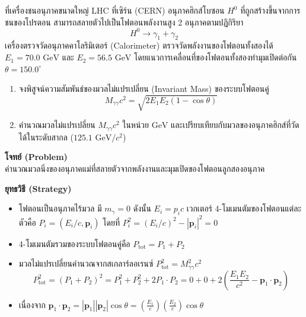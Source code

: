 \begin{psctexample}
ที่เครื่องชนอนุภาคขนาดใหญ่ LHC ที่เซิร์น (CERN) อนุภาคฮิกส์โบซอน $H^0$ ที่ถูกสร้างขึ้นจากการชนของโปรตอน สามารถสลายตัวไปเป็นโฟตอนพลังงานสูง 2 อนุภาคตามปฏิกิริยา
\begin{equation}
H^0 \to \gamma_1 + \gamma_2
\end{equation}
เครื่องตรวจวัดอนุภาคคาโลริมิเตอร์ (Calorimeter) ตรวจวัดพลังงานของโฟตอนทั้งสองได้ $E_1 = 70.0\text{ GeV}$ และ $E_2 = 56.5\text{ GeV}$ โดยแนวการเคลื่อนที่ของโฟตอนทั้งสองทำมุมเปิดต่อกัน $\theta = 150.0^\circ$
\begin{enumerate}
    \item จงพิสูจน์ความสัมพันธ์ของมวลไม่แปรเปลี่ยน (Invariant Mass) ของระบบโฟตอนคู่
    \begin{equation}
    M_{\gamma\gamma} c^2 = \sqrt{2 E_1 E_2 (1 - \cos\theta)}
    \end{equation}
    \item คำนวณมวลไม่แปรเปลี่ยน $M_{\gamma\gamma} c^2$ ในหน่วย $\text{GeV}$ และเปรียบเทียบกับมวลของอนุภาคฮิกส์ที่วัดได้ในระดับสากล ($125.1\text{ GeV}/c^2$)
\end{enumerate}

\textbf{โจทย์ (Problem)} \\
คำนวณ\mbox{มวลนิ่ง}ของอนุภาคแม่ที่สลายตัวจากพลังงานและมุมเปิดของโฟตอนลูกสองอนุภาค

\textbf{ยุทธวิธี (Strategy)} \\
\begin{itemize}
    \item โฟตอนเป็นอนุภาคไร้มวล มี $m_\gamma = 0$ ดังนั้น $E_i = p_i c$ เวกเตอร์ 4-โมเมนตัมของโฟตอนแต่ละตัวคือ $P_i = (E_i/c, \mathbf{p}_i)$ โดยที่ $P_i^2 = (E_i/c)^2 - |\mathbf{p}_i|^2 = 0$
    \item 4-โมเมนตัมรวมของระบบโฟตอนคู่คือ $P_{\text{tot}} = P_1 + P_2$
    \item มวลไม่แปรเปลี่ยนคำนวณจากสเกลาร์ลอเรนซ์ $P_{\text{tot}}^2 = M_{\gamma\gamma}^2 c^2$
    \begin{equation}
    P_{\text{tot}}^2 = (P_1 + P_2)^2 = P_1^2 + P_2^2 + 2 P_1 \cdot P_2 = 0 + 0 + 2 \left(\frac{E_1 E_2}{c^2} - \mathbf{p}_1 \cdot \mathbf{p}_2\right)
    \end{equation}
    \item เนื่องจาก $\mathbf{p}_1 \cdot \mathbf{p}_2 = |\mathbf{p}_1| |\mathbf{p}_2| \cos\theta = \left(\frac{E_1}{c}\right)\left(\frac{E_2}{c}\right)\cos\theta$
\end{itemize}


\end{psctexample}
